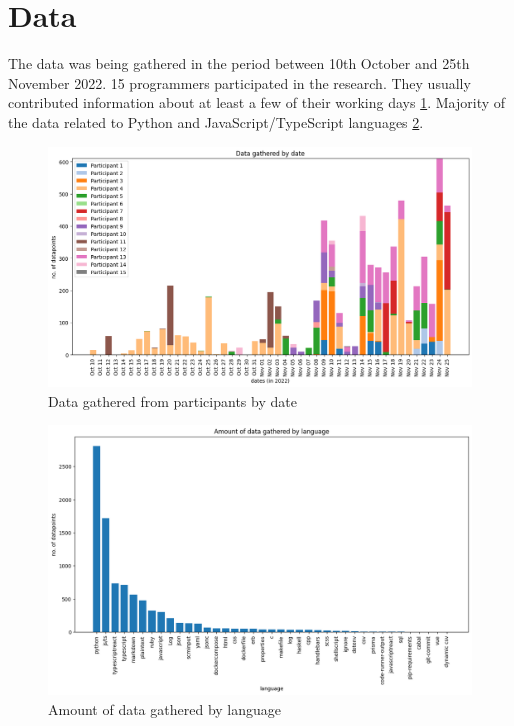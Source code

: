 \section{Data}

The data was being gathered in the period between 10th October and 25th November 2022. 15 programmers participated in the research. They usually contributed information about at least a few of their working days \ref{fig:data_by_date}. Majority of the data related to Python and JavaScript/TypeScript languages \ref{fig:data_by_langs}.

\begin{figure}[htbp]
  \centering
  \includegraphics[scale=0.5]{chapters/methodology/graphics/data-gathered-dates.png}
  \caption{Data gathered from participants by date}
  \label{fig:data_by_date}
\end{figure}

\begin{figure}[htbp]
  \centering
  \includegraphics[scale=0.5]{chapters/results/graphics/languages-total.png}
  \caption{Amount of data gathered by language}
  \label{fig:data_by_langs}
\end{figure}
